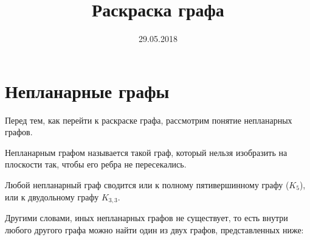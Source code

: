 \documentclass[russian]{lecture-notes}
\title{Раскраска графа}
\date{29.05.2018}
\begin{document}

    \maketitle
    \section*{Непланарные графы}

    Перед тем, как перейти к раскраске графа, рассмотрим понятие непланарных графов.

    \begin{definition}
        Непланарным графом называется такой граф, который нельзя изобразить на плоскости так, чтобы его ребра не пересекались.
    \end{definition}

    \begin{theorem} 
        Любой непланарный граф сводится или к полному пятивершинному графу ($K_5$), или к двудольному графу $K_{3,3}$.
    \end{theorem}

    Другими словами, иных непланарных графов не существует, то есть внутри любого другого графа можно найти один из двух графов, представленных ниже:\\
\end{document}
